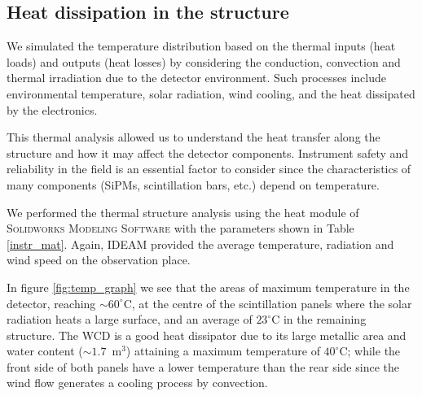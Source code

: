\documentclass[letterpaper,11pt]{article}
\begin{document}
\subsection{Heat dissipation in the structure}
We simulated the temperature distribution based on the thermal inputs (heat loads) and outputs (heat losses) by considering the conduction, convection and thermal irradiation due to the detector environment. Such processes include environmental temperature, solar radiation, wind cooling, and the heat dissipated by the electronics.

This thermal analysis allowed us to understand the heat transfer along the structure and how it may affect the detector components. Instrument safety and reliability in the field is an essential factor to consider since the characteristics of many components (SiPMs, scintillation bars, etc.) depend on temperature. 

We performed the thermal structure analysis using the heat module of \textsc{Solidworks Modeling Software} with the parameters shown in Table \ref{instr_mat}. Again, IDEAM provided the average temperature, radiation and wind speed on the observation place.

In figure \ref{fig:temp_graph} we see that the areas of maximum temperature in the detector, reaching $\sim 60^{\circ}$C, at the centre of the scintillation panels where the solar radiation heats a large surface, and an average of $23^{\circ}$C in the remaining structure. The WCD is a good heat dissipator due to its large metallic area and water content ($\sim 1.7$~m$^3$) attaining a maximum temperature of $40^{\circ}$C; while the front side of both panels have a lower temperature than the rear side since the wind flow generates a cooling process by convection. 
\end{document}
